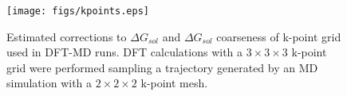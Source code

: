  \begin{figure}[H] %
   \centering
   \texttt{[image: figs/kpoints.eps]} 
\caption{Estimated corrections to $\Delta G_{sol}$ and $\Delta G_{sol}$
coarseness of k-point grid used in DFT-MD runs. DFT calculations with a $3\times
3\times 3$ k-point grid were performed sampling a trajectory generated by an MD
simulation with a $2\times2\times 2$ k-point mesh. }
\end{figure}

